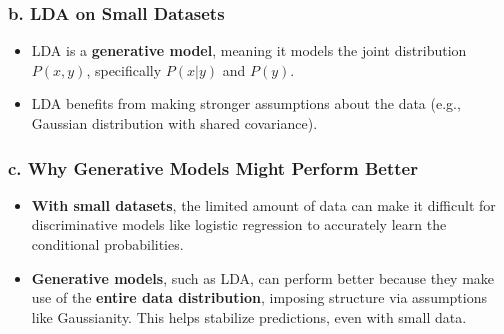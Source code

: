 \documentclass[12pt]{article}
\begin{document}
\subsubsection*{b. LDA on Small Datasets}

\begin{itemize}
    \item LDA is a \textbf{generative model}, meaning it models the joint distribution \(P(x, y)\), specifically \(P(x | y)\) and \(P(y)\). 
    \item LDA benefits from making stronger assumptions about the data (e.g., Gaussian distribution with shared covariance).
\end{itemize}

\subsubsection*{c. Why Generative Models Might Perform Better}

\begin{itemize}
    \item \textbf{With small datasets}, the limited amount of data can make it difficult for discriminative models like logistic regression to accurately learn the conditional probabilities.
    \item \textbf{Generative models}, such as LDA, can perform better because they make use of the \textbf{entire data distribution}, imposing structure via assumptions like Gaussianity. This helps stabilize predictions, even with small data.
\end{itemize}
\end{document}
